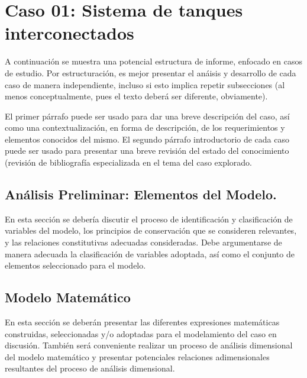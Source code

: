 \documentclass[11pt,stdletter,orderfromtodate,sigleft,twoside]{report}
\begin{document}
\newpage



\section{Caso 01: Sistema de tanques interconectados}
A continuaci\'on se muestra una potencial estructura de informe, enfocado en
casos de estudio. Por estructuraci\'on, es mejor presentar el an\'aisis y
desarrollo de cada caso de manera independiente, incluso si esto implica
repetir subsecciones (al menos conceptualmente, pues el texto deber\'a ser
diferente, obviamente).
\medskip 

El primer p\'arrafo puede ser usado para dar una breve descripci\'on del caso,
as\'i como una contextualizaci\'on, en forma de descripci\'on, de los
requerimientos y elementos conocidos del mismo. El segundo p\'arrafo
introductorio de cada caso puede ser usado para presentar una breve revisi\'on
del estado del conocimiento (revisi\'on de bibliograf\'ia especializada en el
tema del caso explorado.
\medskip

\lipsum[1]
\medskip

\subsection{An\'alisis Preliminar: Elementos del Modelo.}
En esta secci\'on se deber\'ia discutir el proceso de identificaci\'on y
clasificaci\'on de variables del modelo, los principios de conservaci\'on que
se consideren relevantes, y las relaciones constitutivas adecuadas
consideradas. Debe argumentarse de manera adecuada la clasificaci\'on de
variables adoptada, as\'i como el conjunto de elementos seleccionado para el
modelo.
\medskip

\lipsum[2]
\medskip

\subsection{Modelo Matem\'atico}
En esta secci\'on se deber\'an presentar las diferentes expresiones
matem\'aticas construidas, seleccionadas y/o adoptadas para el modelamiento del
caso en discusi\'on. Tambi\'en ser\'a conveniente realizar un proceso de
an\'alisis dimensional del modelo matem\'atico y presentar potenciales
relaciones adimensionales resultantes del proceso de an\'alisis dimensional.
\medskip
\end{document}
